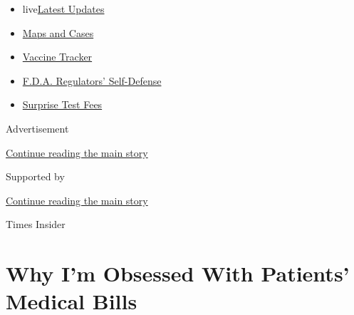 \begin{itemize}
\tightlist
\item
  live\href{https://www.nytimes3xbfgragh.onion/2020/09/11/world/covid-19-coronavirus.html?name=styln-coronavirus-national\&region=TOP_BANNER\&block=storyline_menu_recirc\&action=click\&pgtype=Article\&impression_id=590f0311-f4b7-11ea-8fc3-e39d92f58733\&variant=undefined}{Latest
  Updates}
\item
  \href{https://www.nytimes3xbfgragh.onion/interactive/2020/us/coronavirus-us-cases.html?name=styln-coronavirus-national\&region=TOP_BANNER\&block=storyline_menu_recirc\&action=click\&pgtype=Article\&impression_id=590f0312-f4b7-11ea-8fc3-e39d92f58733\&variant=undefined}{Maps
  and Cases}
\item
  \href{https://www.nytimes3xbfgragh.onion/interactive/2020/science/coronavirus-vaccine-tracker.html?name=styln-coronavirus-national\&region=TOP_BANNER\&block=storyline_menu_recirc\&action=click\&pgtype=Article\&impression_id=590f2a20-f4b7-11ea-8fc3-e39d92f58733\&variant=undefined}{Vaccine
  Tracker}
\item
  \href{https://www.nytimes3xbfgragh.onion/2020/09/10/us/politics/fda-coronavirus-vaccine.html?name=styln-coronavirus-national\&region=TOP_BANNER\&block=storyline_menu_recirc\&action=click\&pgtype=Article\&impression_id=590f2a21-f4b7-11ea-8fc3-e39d92f58733\&variant=undefined}{F.D.A.
  Regulators' Self-Defense}
\item
  \href{https://www.nytimes3xbfgragh.onion/2020/09/09/upshot/coronavirus-surprise-test-fees.html?name=styln-coronavirus-national\&region=TOP_BANNER\&block=storyline_menu_recirc\&action=click\&pgtype=Article\&impression_id=590f2a22-f4b7-11ea-8fc3-e39d92f58733\&variant=undefined}{Surprise
  Test Fees}
\end{itemize}

Advertisement

\protect\hyperlink{after-top}{Continue reading the main story}

Supported by

\protect\hyperlink{after-sponsor}{Continue reading the main story}

Times Insider

\hypertarget{why-im-obsessed-with-patients-medical-bills}{%
\section{Why I'm Obsessed With Patients' Medical
Bills}\label{why-im-obsessed-with-patients-medical-bills}}

